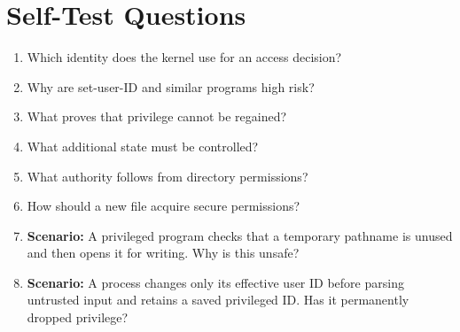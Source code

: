 \documentclass[11pt,letterpaper]{article}
\begin{document}
\section{Self-Test Questions}
\begin{enumerate}
\item Which identity does the kernel use for an access decision?
\item Why are set-user-ID and similar programs high risk?
\item What proves that privilege cannot be regained?
\item What additional state must be controlled?
\item What authority follows from directory permissions?
\item How should a new file acquire secure permissions?
\item \textbf{Scenario:} A privileged program checks that a temporary pathname is unused and then opens it for writing. Why is this unsafe?
\item \textbf{Scenario:} A process changes only its effective user ID before parsing untrusted input and retains a saved privileged ID. Has it permanently dropped privilege?
\end{enumerate}
\clearpage
\end{document}
